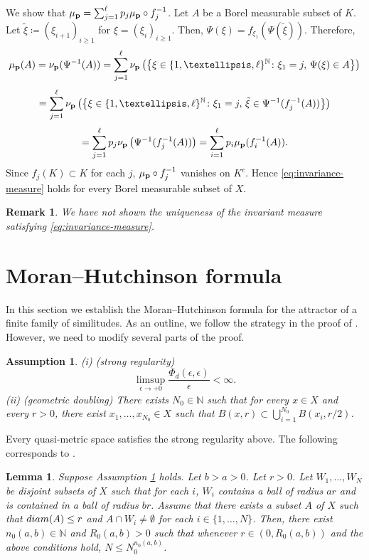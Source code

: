 \documentclass[10pt,a4paper]{amsart}
\newtheorem{Lem}[Thm]{Lemma}
\newtheorem{Ass}[Thm]{Assumption}
\newtheorem{Rem}[Thm]{Remark}
\begin{document}
We show that $\mu_{\bf p} = \sum_{j = 1}^{\ell} p_j \mu_{\bf p} \circ f_{j}^{-1}$. 
Let $A$ be a Borel measurable subset of $K$. 
Let $\tilde{\xi} \coloneqq (\xi_{i+1})_{i \ge 1}$ for $\xi = (\xi_i)_{i \ge 1}$.  
Then, $\Psi(\xi) = f_{\xi_1}\left(\Psi (\tilde{\xi}) \right)$.  
Therefore, 
\[ \mu_{\bf p} (A) = \nu_{\bf p}  (\Psi^{-1}(A)) = \sum_{j = 1}^{\ell} \nu_{\bf p}  \left(  \left\{\xi \in \{1, \dots, \ell\}^{\mathbb N}  \colon \xi_1 = j, \, \Psi(\xi) \in A \right\} \right)  \] 
\[ = \sum_{j = 1}^{\ell} \nu_{\bf p}  \left( \left\{\xi  \in \{1, \dots, \ell\}^{\mathbb N} \colon \xi_1 = j, \, \tilde{\xi} \in \Psi^{-1}(f_j^{-1}(A)) \right\}  \right) \]
\[ = \sum_{j = 1}^{\ell} p_j \nu_{\bf p}  \left(\Psi^{-1}(f_j^{-1}(A))  \right) =  \sum_{i=1}^{\ell} p_i \mu_{\bf p} (f_i^{-1} (A)).  \]
Since $f_j (K) \subset K$ for each $j$, $\mu_{\bf p} \circ f_j^{-1}$ vanishes on $K^c$. 
Hence \eqref{eq:invariance-measure} holds for every Borel measurable subset of $X$. 

\begin{Rem}
We have {\it not} shown the uniqueness of the invariant measure satisfying \eqref{eq:invariance-measure}. 
\end{Rem}



\section{Moran--Hutchinson formula}\label{sec:MH-formula}

In this section we establish the Moran--Hutchinson formula for the attractor of a finite family of similitudes. 
As an outline, we follow the strategy in the proof of  \cite[Theorem 2.2.2]{BishopPeres2017}. 
However, we need to modify several parts of the proof.  


\begin{Ass}\label{ass:two-additional-metric}
(i) (strong regularity)
\[ \limsup_{\epsilon \to +0} \frac{\Phi_d (\epsilon, \epsilon)}{\epsilon} < \infty.  \]
(ii) (geometric doubling)
There exists $N_0 \in \mathbb{N}$ such that for every $x \in X$ and every $r > 0$, there exist $x_1, \dots, x_{N_0} \in X$ such that $B(x,r) \subset \bigcup_{i=1}^{N_0} B(x_i, r/2)$. 
\end{Ass}

Every quasi-metric space satisfies the strong regularity above. 
The following corresponds to \cite[Lemma 3.3]{BaloghRohner2007}. 

\begin{Lem}\label{lem:number-disjoint}
Suppose Assumption \ref{ass:two-additional-metric} holds. 
Let $b > a > 0$. 
Let $r > 0$. 
Let $W_1, \dots, W_N$ be disjoint subsets of $X$ such that for each $i$, $W_i$ contains a ball of radius $ar$ and is contained in a ball of radius $br$. 
Assume that there exists a subset $A$ of $X$ such that  
$\textup{diam}(A) \le r$ and $A \cap W_i \ne \emptyset$ for each $i \in \{1, \dots, N\}$. 
Then, there exist  $n_0 (a,b) \in \mathbb{N}$ and $R_0 (a,b) > 0$ such that whenever $r \in (0, R_0 (a,b))$ and the above conditions hold, $N \le N_0^{n_0 (a,b)}$. 
\end{Lem}
\end{document}
